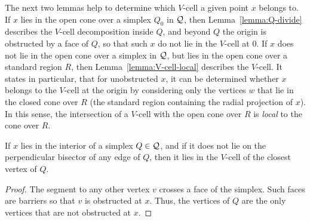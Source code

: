 \begin{remark} The next two lemmas help to determine which $V$-cell
a given point $x$ belongs to.  If $x$ lies in the open cone over a
simplex $Q_0$ in ${\mathcal Q}$, then Lemma~\ref{lemma:Q-divide}
describes the $V$-cell decomposition inside $Q$, and beyond $Q$
the origin is obstructed by a face of $Q$, so that such $x$ do not
lie in the $V$-cell at $0$. If $x$ does not lie in the open cone
over a simplex in ${\mathcal Q}$, but lies in the open cone over a
standard region $R$, then Lemma~\ref{lemma:V-cell-local} describes
the $V$-cell.  It states in particular, that for unobstructed $x$,
it can be determined whether $x$ belongs to the $V$-cell at the
origin by considering only the vertices $w$ that lie in the closed
cone over $R$ (the standard region containing the radial
projection of $x$). In this sense, the intersection of a $V$-cell
with the open cone over $R$ is {\it local\/} to the cone over $R$.
\end{remark}

\begin{lemma}\label{lemma:Q-divide}
If $x$ lies in the interior of a simplex $Q\in{\mathcal Q}$, and if it
does not lie on the perpendicular bisector of any edge of $Q$,
then it lies in the $V$-cell of the closest vertex of $Q$.
\end{lemma}

\begin{proof} The segment to any other vertex $v$ crosses a face of the
simplex. Such faces are barriers so that $v$ is obstructed at $x$. Thus,
the vertices of $Q$ are the only vertices that are not obstructed at
$x$.
\end{proof}


